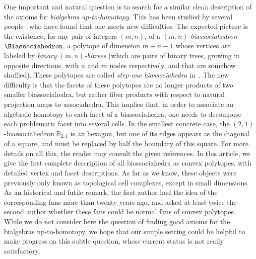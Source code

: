 \documentclass[AHL,Unicode,longabstracts,published]{cedram}
\newcommand{\polytope}[1]{\mathds{#1}}
\begin{document}
One important and natural question is to search for a similar clean description of the axioms for
\emph{bialgebras up-to-homotopy}. This has been studied by several people~\cite{Markl,MerkulovWillwacher,
SaneblidzeUmble-matrads} who have found that one meets new difficulties. The expected picture is the existence, for any pair of integers $(m,n)$, of a
\emph{$(m,n)$-biassociahedron} $\Biassociahedron$, a polytope of dimension $m+n-1$ whose vertices are labeled by
\emph{binary $(m,n)$-bitrees} (which are pairs of binary trees, growing in opposite directions, with $n$ and $m$ nodes respectively, and that are somehow shuffled). These polytopes are called
\emph{step-one biassociahedra} in~\cite{Markl}. The new difficulty is that the facets of these polytopes are no longer products of two smaller biassociahedra, but rather fiber products with respect to natural projection maps to associahedra. This implies that, in order to associate an algebraic homotopy to each facet of a biassociahedra, one needs to decompose each problematic facet into several cells. In the smallest concrete case, the $(2,1)$-biassociahedron $\polytope{B}_{2,1}$ is an hexagon, but one of its edges appears as the diagonal of a square, and must be replaced by half the boundary of this square. For more details on all this, the reader may consult the given references. In this article, we give the first complete description of all biassociahedra as convex polytopes, with detailed vertex and facet descriptions. As far as we know, these objects were previously only known as topological cell complexes, except in small dimensions. As an historical and futile remark, the first author had the idea of the corresponding fans more than twenty years ago, and asked at least twice the second author whether these fans could be normal fans of convex polytopes. While we do not consider here the question of finding good axioms for the bialgebras up-to-homotopy, we hope that our simple setting could be helpful to make progress on this subtle question, whose current status is not really satisfactory.
\end{document}
